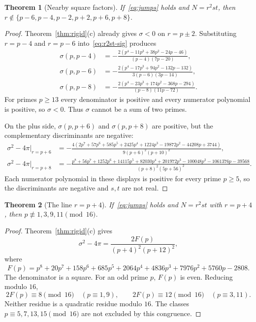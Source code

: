 \documentclass[11pt,reqno]{amsart}
\newtheorem{theorem}{Theorem}
\theoremstyle{definition}
\begin{document}
\begin{theorem}[Nearby square factors]
\label{thm:r2st-off}
If~\eqref{eq:jumps} holds and \(N=r^2st\), then \(r\notin\{p-6,p-4,p-2,p+2,p+6,p+8\}\).
\end{theorem}

\begin{proof}
Theorem~\ref{thm:rigid}(c) already gives \(\sigma<0\) on \(r=p\pm 2\). Substituting \(r=p-4\) and \(r=p-6\) into~\eqref{eq:r2st-sig} produces
\begin{align*}
\sigma(p,p-4)&=-\frac{2(p^4-11p^3+38p^2-24p-46)}{(p-4)(7p-20)},\\
\sigma(p,p-6)&=-\frac{2(p^4-17p^3+94p^2-132p-132)}{3(p-6)(3p-14)},\\
\sigma(p,p-8)&=-\frac{2(p^4-23p^3+174p^2-368p-294)}{(p-8)(11p-72)}.
\end{align*}
For primes \(p\ge 13\) every denominator is positive and every numerator polynomial is positive, so \(\sigma<0\). Thus \(\sigma\) cannot be a sum of two primes.

On the plus side, \(\sigma(p,p+6)\) and \(\sigma(p,p+8)\) are positive, but the complementary discriminants are negative:
\begin{align*}
\sigma^2-4\pi\big|_{r=p+6}
&=-\frac{4(2p^7+57p^6+585p^5+2425p^4+1224p^3-19872p^2-44208p+3744)}{9(p+6)^2(p+10)^2},\\
\sigma^2-4\pi\big|_{r=p+8}
&=-\frac{p^8+56p^7+1252p^6+14115p^5+82030p^4+201972p^3-100048p^2-1061376p-39568}{(p+8)^2(5p+56)^2}.
\end{align*}
Each numerator polynomial in these displays is positive for every prime \(p\ge 5\), so the discriminants are negative and \(s,t\) are not real.
\end{proof}

\begin{theorem}[The line \(r=p+4\)]
\label{thm:rp4}
If~\eqref{eq:jumps} holds and \(N=r^2st\) with \(r=p+4\), then \(p\not\equiv 1,3,9,11\pmod{16}\).
\end{theorem}

\begin{proof}
Theorem~\ref{thm:rigid}(c) gives
\[
\sigma^2-4\pi=\frac{2F(p)}{(p+4)^2(p+12)^2},
\]
where
\[
F(p)=p^8+20p^7+158p^6+685p^5+2064p^4+4836p^3+7976p^2+5760p-2808.
\]
The denominator is a square. For an odd prime \(p\), \(F(p)\) is even. Reducing modulo \(16\),
\[
2F(p)\equiv 8\pmod{16}\quad(p\equiv 1,9),\qquad
2F(p)\equiv 12\pmod{16}\quad(p\equiv 3,11).
\]
Neither residue is a quadratic residue modulo \(16\). The classes \(p\equiv 5,7,13,15\pmod{16}\) are not excluded by this congruence.
\end{proof}
\end{document}
